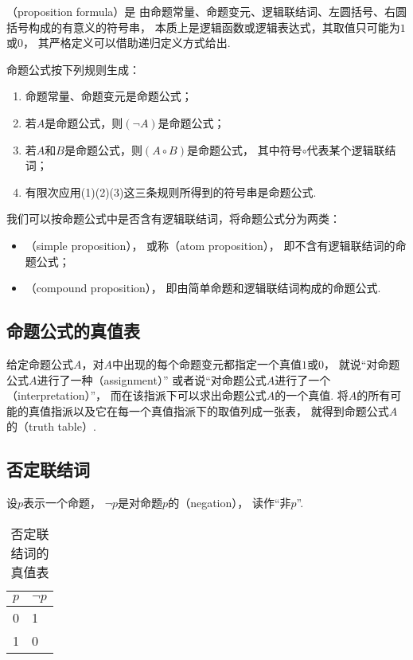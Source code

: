 （proposition formula）是
由命题常量、命题变元、逻辑联结词、左圆括号、右圆括号构成的有意义的符号串，
本质上是逻辑函数或逻辑表达式，其取值只可能为\(1\)或\(0\)，
其严格定义可以借助递归定义方式给出.
\begin{definition}
命题公式按下列规则生成：\begin{enumerate}[label={(\arabic*)}]
	\item 命题常量、命题变元是命题公式；
	\item 若\(A\)是命题公式，则\((\neg A)\)是命题公式；
	\item 若\(A\)和\(B\)是命题公式，则\((A \circ B)\)是命题公式，
	其中符号\(\circ\)代表某个逻辑联结词；
	\item 有限次应用(1)(2)(3)这三条规则所得到的符号串是命题公式.
\end{enumerate}
\end{definition}

我们可以按命题公式中是否含有逻辑联结词，将命题公式分为两类：\begin{itemize}
	\item {}（simple proposition），
	或称（atom proposition），
	即不含有逻辑联结词的命题公式；
	\item {}（compound proposition），
	即由简单命题和逻辑联结词构成的命题公式.
\end{itemize}

\subsection{命题公式的真值表}
给定命题公式\(A\)，对\(A\)中出现的每个命题变元都指定一个真值\(1\)或\(0\)，
就说“对命题公式\(A\)进行了一种（assignment）”
或者说“对命题公式\(A\)进行了一个（interpretation）”，
而在该指派下可以求出命题公式\(A\)的一个真值.
将\(A\)的所有可能的真值指派以及它在每一个真值指派下的取值列成一张表，
就得到命题公式\(A\)的（truth table）.

\subsection{否定联结词}
设\(p\)表示一个命题，
\(\neg p\)是对命题\(p\)的（negation），
读作“非\(p\)”.

\begin{table}[ht]
	\centering
	\begin{tabular}{|c|p{1.5cm}|}
		\hline
		\(p\) & \(\neg p\) \\
		\hline
		0 & 1 \\
		1 & 0 \\
		\hline
	\end{tabular}
	\caption{否定联结词的真值表}
\end{table}

